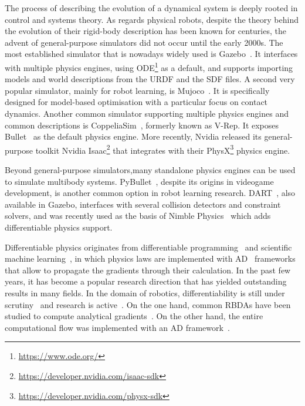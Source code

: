 The process of describing the evolution of a dynamical system is deeply rooted in control and systems theory.
As regards physical robots, despite the theory behind the evolution of their rigid-body description has been known for centuries, the advent of general-purpose simulators did not occur until the early 2000s.
The most established simulator that is nowadays widely used is Gazebo~\parencite{koenig_design_2004}.
It interfaces with multiple physics engines, using ODE\footnote{\url{https://www.ode.org/}} as a default, and supports importing models and world descriptions from the \ac{URDF} and the \ac{SDF} files.
A second very popular simulator, mainly for robot learning, is Mujoco~\parencite{todorov_mujoco_2012}.
It is specifically designed for model-based optimisation with a particular focus on contact dynamics.
Another common simulator supporting multiple physics engines and common descriptions is CoppeliaSim~\parencite{rohmer_v-rep_2013}, formerly known as V-Rep.
It exposes Bullet~\parencite{coumans_pybullet_2016} as the default physics engine.
More recently, Nvidia released its general-purpose toolkit Nvidia Isaac\footnote{\url{https://developer.nvidia.com/isaac-sdk}} that integrates with their PhysX\footnote{\url{https://developer.nvidia.com/physx-sdk}} physics engine.

Beyond general-purpose simulators,many standalone physics engines can be used to simulate multibody systems.
PyBullet~\parencite{coumans_pybullet_2016}, despite its origins in videogame development, is another common option in robot learning research.
DART~\parencite{lee_dart_2018}, also available in Gazebo, interfaces with several collision detectors and constraint solvers, and was recently used as the basis of Nimble Physics~\parencite{werling_fast_2021} which adds differentiable physics support.

Differentiable physics originates from differentiable programming~\parencite{innes_differentiable_2019} and scientific machine learning~\parencite{rackauckas_universal_2021}, in which physics laws are implemented with \ac{AD}~\parencite{baydin_automatic_2018} frameworks that allow to propagate the gradients through their calculation.
In the past few years, it has become a popular research direction that has yielded outstanding results in many fields.
In the domain of robotics, differentiability is still under scrutiny~\parencite{suh_differentiable_2022} and research is active~\parencite{gillen_leveraging_2022}.
On the one hand, common \acp{RBDA} have been studied to compute analytical gradients~\parencite{carpentier_analytical_2018, belbute-peres_end--end_2018}.
On the other hand, the entire computational flow was implemented with an \ac{AD} framework~\parencite{freeman_brax_2021, howell_dojo_2022}.

